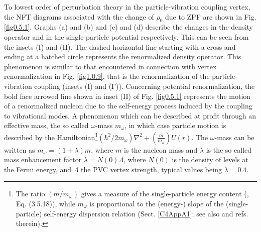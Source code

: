To lowest order of perturbation theory in the particle-vibration coupling vertex, the NFT diagrams associated with the change of $\rho_0$ due to ZPF are shown in Fig. \ref{fig0.5.1}. Graphs (a) and (b) and (c) and (d) describe the changes in the density operator and in the single-particle potential respectively. This can be seen from the insets (I) and (II). The dashed horizontal line starting with a cross and ending at a hatched circle represents the renormalized density operator. This phenomenon is similar to that encountered in connection with vertex renormalization in Fig. \ref{fig1.0.9}, that is the renormalization of the particle-vibration coupling (insets (I) and (I')). Concerning potential renormalization, the bold face arrowed line shown in inset (II) of Fig. \ref{fig0.5.1} represents the motion of a renormalized nucleon due to the self-energy process induced by the coupling to vibrational modes. A phenomenon which can be described at profit through an effective mass, the so called $\omega$-mass $m_\omega$, in which case particle motion is described by the Hamiltonian\footnote{The ratio $(m/m_\omega)$ gives a measure of the single-particle energy content (\cite{Mahaux:85}, Eq. (3.5.18)), while $m_\omega$ is proportional to the (energy-) slope of the (single-particle) self-energy dispersion relation (Sect. \ref{C4AppA1}; see also  \cite{Brink:05} and refs. therein).}$\left(\hbar^2/2m_\omega\right)\nabla^2+\left(\frac{m}{m_\omega}\right)U(r)$. The $\omega$-mass can be written as $m_\omega=(1+\lambda)m$, where $m$ is the nucleon mass and $\lambda$ is the so called mass enhancement factor $\lambda=N(0)\Lambda$, where $N(0)$ is the density of levels at the Fermi energy, and $\Lambda$ the PVC vertex strength, typical values being $\lambda=0.4$.

